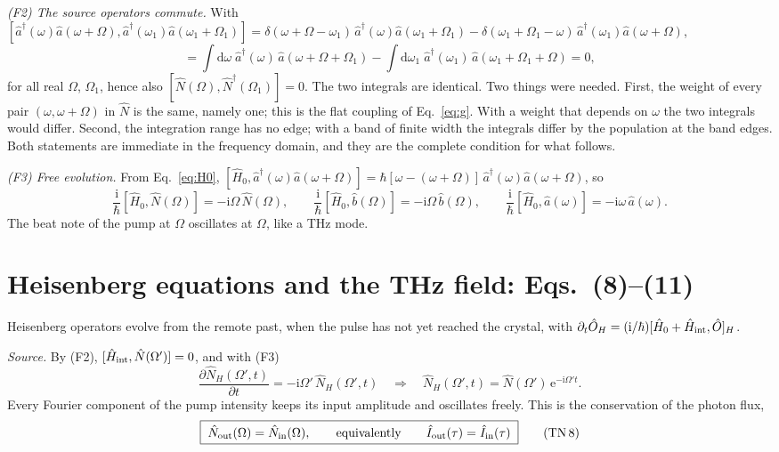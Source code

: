 \documentclass[aps,pra,onecolumn,notitlepage,11pt,amsmath,amssymb,nofootinbib]{revtex4-2}
\newcommand{\Nop}{\hat N}
\newcommand{\Iop}{\hat I}
\newcommand{\dd}{\mathrm{d}}
\newcommand{\ee}{\mathrm{e}}
\newcommand{\ii}{\mathrm{i}}
\newcommand{\TN}[1]{\text{TN\,#1}}
\begin{document}
\emph{(F2) The source operators commute.} With
$[\hat a^\dagger(\omega)\hat a(\omega+\Omega),\hat a^\dagger(\omega_1)\hat a(\omega_1+\Omega_1)]
=\delta(\omega+\Omega-\omega_1)\,\hat a^\dagger(\omega)\hat a(\omega_1+\Omega_1)
-\delta(\omega_1+\Omega_1-\omega)\,\hat a^\dagger(\omega_1)\hat a(\omega+\Omega)$,
\begin{equation}
[\Nop(\Omega),\Nop(\Omega_1)]
=\int\!\dd\omega\;\hat a^\dagger(\omega)\,\hat a(\omega+\Omega+\Omega_1)
-\int\!\dd\omega_1\;\hat a^\dagger(\omega_1)\,\hat a(\omega_1+\Omega_1+\Omega)=0 ,
\label{eq:F2}
\end{equation}
for all real $\Omega$, $\Omega_1$, hence also
$[\Nop(\Omega),\Nop^\dagger(\Omega_1)]=0$. The two integrals are identical.
Two things were needed. First, the weight of every pair
$(\omega,\omega+\Omega)$ in $\Nop$ is the same, namely one; this is the flat
coupling of Eq.~\eqref{eq:g}. With a weight that depends on $\omega$ the two
integrals would differ. Second, the integration range has no edge; with a
band of finite width the integrals differ by the population at the band
edges. Both statements are immediate in the frequency domain, and they are
the complete condition for what follows.

\emph{(F3) Free evolution.} From Eq.~\eqref{eq:H0},
$[\hat H_0,\hat a^\dagger(\omega)\hat a(\omega+\Omega)]
=\hbar[\omega-(\omega+\Omega)]\,\hat a^\dagger(\omega)\hat a(\omega+\Omega)$, so
\begin{equation}
\frac{\ii}{\hbar}[\hat H_0,\Nop(\Omega)]=-\ii\Omega\,\Nop(\Omega),\qquad
\frac{\ii}{\hbar}[\hat H_0,\hat b(\Omega)]=-\ii\Omega\,\hat b(\Omega),\qquad
\frac{\ii}{\hbar}[\hat H_0,\hat a(\omega)]=-\ii\omega\,\hat a(\omega).
\label{eq:F3}
\end{equation}
The beat note of the pump at $\Omega$ oscillates at $\Omega$, like a THz mode.

\section{Heisenberg equations and the THz field: Eqs.~(8)--(11)}
\label{sec:thz}

Heisenberg operators evolve from the remote past, when the pulse has not yet
reached the crystal, with
$\partial_t\hat O_H=(\ii/\hbar)[\hat H_0+\hat H_{\rm int},\hat O]_H$.

\emph{Source.} By (F2), $[\hat H_{\rm int},\Nop(\Omega')]=0$, and with (F3)
\begin{equation}
\frac{\partial\Nop_H(\Omega',t)}{\partial t}=-\ii\Omega'\,\Nop_H(\Omega',t)
\quad\Longrightarrow\quad
\Nop_H(\Omega',t)=\Nop(\Omega')\,\ee^{-\ii\Omega't}.
\label{eq:Nsol}
\end{equation}
Every Fourier component of the pump intensity keeps its input amplitude and
oscillates freely. This is the conservation of the photon flux,
\begin{equation}
\boxed{\;\Nop_{\rm out}(\Omega)=\Nop_{\rm in}(\Omega),\qquad\text{equivalently}\qquad
\Iop_{\rm out}(\tau)=\Iop_{\rm in}(\tau)\;}
\tag{\TN{8}}
\end{equation}
\end{document}
